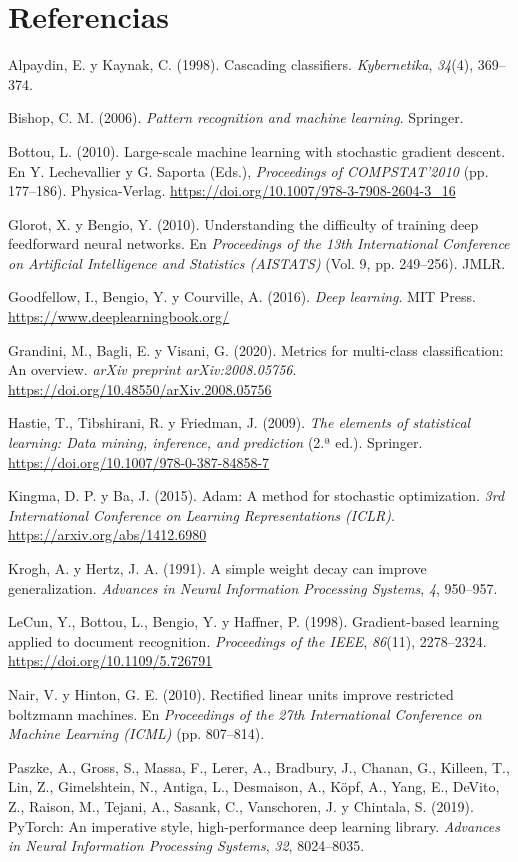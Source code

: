 \documentclass[12pt,letterpaper]{article}
\newcommand{\refapa}[1]{\par\noindent\hangindent=0.5in\hangafter=1 #1\par}
\begin{document}
\clearpage\section{Referencias}
\refapa{Alpaydin, E. y Kaynak, C. (1998). Cascading classifiers. \textit{Kybernetika}, \textit{34}(4), 369--374.}
\refapa{Bishop, C. M. (2006). \textit{Pattern recognition and machine learning}. Springer.}
\refapa{Bottou, L. (2010). Large-scale machine learning with stochastic gradient descent. En Y. Lechevallier y G. Saporta (Eds.), \textit{Proceedings of COMPSTAT'2010} (pp. 177--186). Physica-Verlag. \url{https://doi.org/10.1007/978-3-7908-2604-3_16}}
\refapa{Glorot, X. y Bengio, Y. (2010). Understanding the difficulty of training deep feedforward neural networks. En \textit{Proceedings of the 13th International Conference on Artificial Intelligence and Statistics (AISTATS)} (Vol. 9, pp. 249--256). JMLR.}
\refapa{Goodfellow, I., Bengio, Y. y Courville, A. (2016). \textit{Deep learning}. MIT Press. \url{https://www.deeplearningbook.org/}}
\refapa{Grandini, M., Bagli, E. y Visani, G. (2020). Metrics for multi-class classification: An overview. \textit{arXiv preprint arXiv:2008.05756}. \url{https://doi.org/10.48550/arXiv.2008.05756}}
\refapa{Hastie, T., Tibshirani, R. y Friedman, J. (2009). \textit{The elements of statistical learning: Data mining, inference, and prediction} (2.ª ed.). Springer. \url{https://doi.org/10.1007/978-0-387-84858-7}}
\refapa{Kingma, D. P. y Ba, J. (2015). Adam: A method for stochastic optimization. \textit{3rd International Conference on Learning Representations (ICLR)}. \url{https://arxiv.org/abs/1412.6980}}
\refapa{Krogh, A. y Hertz, J. A. (1991). A simple weight decay can improve generalization. \textit{Advances in Neural Information Processing Systems}, \textit{4}, 950--957.}
\refapa{LeCun, Y., Bottou, L., Bengio, Y. y Haffner, P. (1998). Gradient-based learning applied to document recognition. \textit{Proceedings of the IEEE}, \textit{86}(11), 2278--2324. \url{https://doi.org/10.1109/5.726791}}
\refapa{Nair, V. y Hinton, G. E. (2010). Rectified linear units improve restricted boltzmann machines. En \textit{Proceedings of the 27th International Conference on Machine Learning (ICML)} (pp. 807--814).}
\refapa{Paszke, A., Gross, S., Massa, F., Lerer, A., Bradbury, J., Chanan, G., Killeen, T., Lin, Z., Gimelshtein, N., Antiga, L., Desmaison, A., Köpf, A., Yang, E., DeVito, Z., Raison, M., Tejani, A., Sasank, C., Vanschoren, J. y Chintala, S. (2019). PyTorch: An imperative style, high-performance deep learning library. \textit{Advances in Neural Information Processing Systems}, \textit{32}, 8024--8035.}
\end{document}
